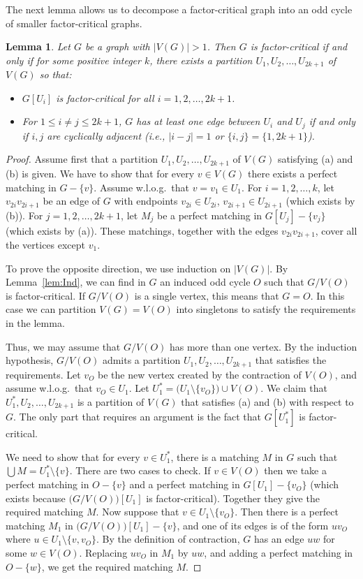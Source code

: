 \documentclass{article}
\newtheorem{lemma}[theorem]{Lemma}
\theoremstyle{definition}
\begin{document}
The next lemma allows us to decompose a factor-critical graph into an odd cycle of smaller factor-critical graphs.
\begin{lemma} \label{lem:Odd}
Let $G$ be a graph with $|V(G)| > 1$. Then $G$ is factor-critical if and only if for some positive integer $k$, there exists a partition $U_1, U_2, \ldots , U_{2k+1}$ of $V(G)$ so that:
\begin{itemize}
\item[(a)] $G[U_i]$ is factor-critical for all $i=1,2, \ldots , 2k+1$.
\item[(b)] For $1 \le i \ne j \le 2k+1$, $G$ has at least one edge between $U_i$ and $U_j$ if and only if $i, j$ are cyclically adjacent (i.e., $|i-j| = 1$ or $\{i,j\} = \{1, 2k+1\}$).
\end{itemize}
\end{lemma}
\begin{proof} Assume first that a partition $U_1, U_2, \ldots , U_{2k+1}$ of $V(G)$ satisfying (a) and (b) is given. We have to show that for every $v \in V(G)$ there exists a perfect matching in $G - \{v\}$. Assume w.l.o.g.\ that $v = v_1 \in U_1$. For $i=1,2, \ldots , k$, let $v_{2i}v_{2i+1}$ be an edge of $G$ with endpoints $v_{2i} \in U_{2i}$, $v_{2i+1} \in U_{2i+1}$ (which exists by (b)). For $j=1,2, \ldots , 2k+1$, let $M_j$ be a perfect matching in $G[U_j] - \{v_j\}$ (which exists by (a)). These matchings, together with the edges $v_{2i}v_{2i+1}$, cover all the vertices except $v_1$.

To prove the opposite direction, we use induction on $|V(G)|$. By Lemma~\ref{lem:Ind}, we can find in $G$ an induced odd cycle $O$ such that $G/V(O)$ is factor-critical. If $G/V(O)$ is a single vertex, this means that $G=O$. In this case we can partition $V(G) = V(O)$ into singletons to satisfy the requirements in the lemma.

Thus, we may assume that $G/V(O)$ has more than one vertex. By the induction hypothesis, $G/V(O)$ admits a partition $U_1, U_2, \ldots , U_{2k+1}$ that satisfies the requirements. Let $v_O$ be the new vertex created by the contraction of $V(O)$, and assume w.l.o.g.\ that $v_O \in U_1$. Let $U^*_1 = \bigl( U_1 \setminus \{v_O\}\bigr) \cup V(O)$. We claim that $U^*_1, U_2, \ldots , U_{2k+1}$ is a partition of $V(G)$ that satisfies (a) and (b) with respect to $G$. The only part that requires an argument is the fact that $G[U^*_1]$ is factor-critical.

We need to show that for every $v \in U^*_1$, there is a matching $M$ in $G$ such that $\bigcup M = U^*_1 \setminus \{v\}$. There are two cases to check. If $v \in V(O)$ then we take a perfect matching in $O - \{v\}$ and a perfect matching in $G[U_1] - \{v_O\}$ (which exists because $\bigl( G/V(O)\bigr)[U_1]$ is factor-critical). Together they give the required matching $M$. Now suppose that $v \in U_1 \setminus \{v_O\}$. Then there is a perfect matching $M_1$ in $\bigl( G/V(O)\bigr)[U_1] - \{v\}$, and one of its edges is of the form $uv_O$ where $u \in U_1 \setminus \{v, v_O\}$. By the definition of contraction, $G$ has an edge $uw$ for some $w \in V(O)$. Replacing $uv_O$ in $M_1$ by $uw$, and adding a perfect matching in $O - \{w\}$, we get the required matching $M$.
\end{proof}
\end{document}
